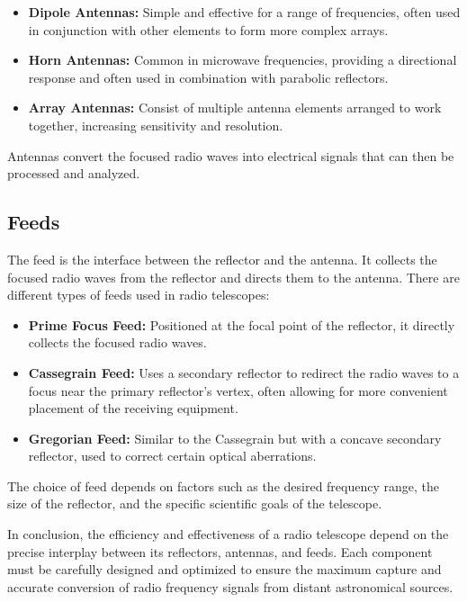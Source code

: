 \begin{itemize}
    \item \textbf{Dipole Antennas:} Simple and effective for a range of frequencies, often used in conjunction with other elements to form more complex arrays.
    \item \textbf{Horn Antennas:} Common in microwave frequencies, providing a directional response and often used in combination with parabolic reflectors.
    \item \textbf{Array Antennas:} Consist of multiple antenna elements arranged to work together, increasing sensitivity and resolution.
\end{itemize}

Antennas convert the focused radio waves into electrical signals that can then be processed and analyzed.

\subsection{Feeds}

The feed is the interface between the reflector and the antenna. It collects the focused radio waves from the reflector and directs them to the antenna. There are different types of feeds used in radio telescopes:

\begin{itemize}
    \item \textbf{Prime Focus Feed:} Positioned at the focal point of the reflector, it directly collects the focused radio waves.
    \item \textbf{Cassegrain Feed:} Uses a secondary reflector to redirect the radio waves to a focus near the primary reflector's vertex, often allowing for more convenient placement of the receiving equipment.
    \item \textbf{Gregorian Feed:} Similar to the Cassegrain but with a concave secondary reflector, used to correct certain optical aberrations.
\end{itemize}

The choice of feed depends on factors such as the desired frequency range, the size of the reflector, and the specific scientific goals of the telescope.

In conclusion, the efficiency and effectiveness of a radio telescope depend on the precise interplay between its reflectors, antennas, and feeds. Each component must be carefully designed and optimized to ensure the maximum capture and accurate conversion of radio frequency signals from distant astronomical sources. 

